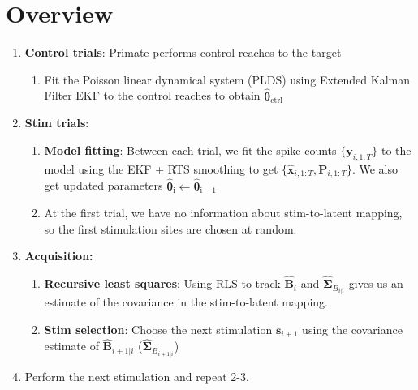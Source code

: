 \documentclass[11pt,letterpaper]{article} %
\begin{document}
\section*{Overview}
\begin{enumerate}
    \item \textbf{Control trials}: Primate performs control reaches to the target
    \begin{enumerate}
        \item Fit the Poisson linear dynamical system (PLDS) using Extended Kalman Filter EKF to the control reaches to obtain $\hat{\bm{\theta}}_{\mathrm{ctrl}}$
    \end{enumerate}
    \item \textbf{Stim trials}:
    \begin{enumerate}
        \item \textbf{Model fitting}: Between each trial, we fit the spike counts $\{\bm{y}_{i,1:T}\}$ to the model using the EKF + RTS smoothing to get $\{\hat{\bm{x}}_{i,1:T}, \bm{P}_{i,1:T}\}$. We also get updated parameters $\hat{\bm{\theta}}_{\mathrm{i}} \leftarrow \hat{\bm{\theta}}_{\mathrm{i-1}}$
        \item At the first trial, we have no information about stim-to-latent mapping, so the first stimulation sites are chosen at random.
    \end{enumerate}
    \item \textbf{Acquisition:}
    \begin{enumerate}
        \item \textbf{Recursive least squares}: Using RLS to track $\hat{\bm{B}}_i$ and $\boldsymbol{\hat\Sigma}_{B_{i|i}}$ gives us an estimate of the covariance in the stim-to-latent mapping.
        \item \textbf{Stim selection}: Choose the next stimulation $\bm{s}_{i+1}$ using the covariance estimate of $\hat{\bm{B}}_{i+1|i}$ ($\hat{\bm{\Sigma}}_{B_{i+1|i}}$)
    \end{enumerate}
    \item Perform the next stimulation and repeat 2-3.
\end{enumerate}

\clearpage
\end{document}
